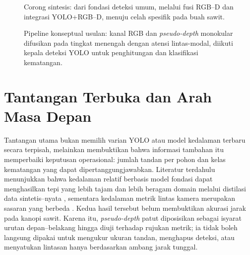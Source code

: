 \begin{figure}[t]
\centering
{}
\caption{Corong sintesis: dari fondasi deteksi umum, melalui fusi RGB--D
dan integrasi YOLO+RGB--D, menuju celah spesifik pada buah sawit.}
\label{fig:funnel}
\end{figure}

\begin{figure}[t]
\centering
{}
\caption{Pipeline konseptual usulan: kanal RGB dan \textit{pseudo-depth}
monokular difusikan pada tingkat menengah dengan atensi lintas-modal,
diikuti kepala deteksi YOLO untuk penghitungan dan klasifikasi kematangan.}
\label{fig:pipeline}
\end{figure}


\section{Tantangan Terbuka dan Arah Masa Depan}\label{sec:tantangan}
Tantangan utama bukan memilih varian YOLO atau model kedalaman terbaru secara
terpisah, melainkan membuktikan bahwa informasi tambahan itu memperbaiki
keputusan operasional: jumlah tandan per pohon dan kelas kematangan yang dapat
dipertanggungjawabkan. Literatur terdahulu menunjukkan bahwa kedalaman relatif
berbasis model fondasi dapat menghasilkan tepi yang lebih tajam dan lebih
beragam domain melalui distilasi data sintetis--nyata \cite{yang2024depthanythingv2},
sementara kedalaman metrik lintas kamera merupakan sasaran yang berbeda
\cite{ganesan2026unidac}. Kedua hasil tersebut belum membuktikan akurasi jarak
pada kanopi sawit. Karena itu, \textit{pseudo-depth} patut diposisikan sebagai
isyarat urutan depan--belakang hingga diuji terhadap rujukan metrik; ia tidak
boleh langsung dipakai untuk mengukur ukuran tandan, menghapus deteksi, atau
menyatukan lintasan hanya berdasarkan ambang jarak tunggal.

